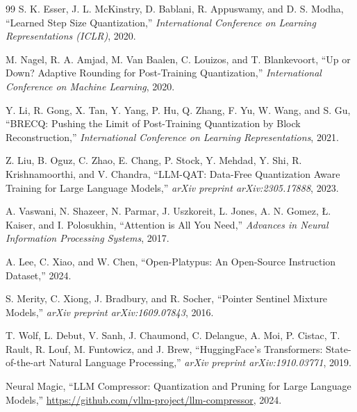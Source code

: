 \documentclass[10pt,twocolumn,letterpaper]{article}
\begin{document}
\begin{thebibliography}{99}
S. K. Esser, J. L. McKinstry, D. Bablani, R. Appuswamy, and D. S. Modha, ``Learned Step Size Quantization,'' \textit{International Conference on Learning Representations (ICLR)}, 2020.

M. Nagel, R. A. Amjad, M. Van Baalen, C. Louizos, and T. Blankevoort, ``Up or Down? Adaptive Rounding for Post-Training Quantization,'' \textit{International Conference on Machine Learning}, 2020.

Y. Li, R. Gong, X. Tan, Y. Yang, P. Hu, Q. Zhang, F. Yu, W. Wang, and S. Gu, ``BRECQ: Pushing the Limit of Post-Training Quantization by Block Reconstruction,'' \textit{International Conference on Learning Representations}, 2021.

Z. Liu, B. Oguz, C. Zhao, E. Chang, P. Stock, Y. Mehdad, Y. Shi, R. Krishnamoorthi, and V. Chandra, ``LLM-QAT: Data-Free Quantization Aware Training for Large Language Models,'' \textit{arXiv preprint arXiv:2305.17888}, 2023.

A. Vaswani, N. Shazeer, N. Parmar, J. Uszkoreit, L. Jones, A. N. Gomez, {\L}. Kaiser, and I. Polosukhin, ``Attention is All You Need,'' \textit{Advances in Neural Information Processing Systems}, 2017.

A. Lee, C. Xiao, and W. Chen, ``Open-Platypus: An Open-Source Instruction Dataset,'' 2024.

S. Merity, C. Xiong, J. Bradbury, and R. Socher, ``Pointer Sentinel Mixture Models,'' \textit{arXiv preprint arXiv:1609.07843}, 2016.

T. Wolf, L. Debut, V. Sanh, J. Chaumond, C. Delangue, A. Moi, P. Cistac, T. Rault, R. Louf, M. Funtowicz, and J. Brew, ``HuggingFace's Transformers: State-of-the-art Natural Language Processing,'' \textit{arXiv preprint arXiv:1910.03771}, 2019.

Neural Magic, ``LLM Compressor: Quantization and Pruning for Large Language Models,'' \url{https://github.com/vllm-project/llm-compressor}, 2024.
\end{thebibliography}
\end{document}
